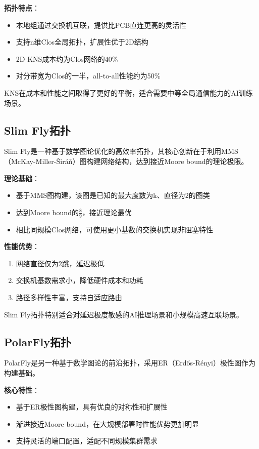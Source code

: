 \textbf{拓扑特点}：
\begin{itemize}
    \item 本地组通过交换机互联，提供比PCB直连更高的灵活性
    \item 支持n维Clos全局拓扑，扩展性优于2D结构
    \item 2D KNS成本约为Clos网络的40\%
    \item 对分带宽为Clos的一半，all-to-all性能约为50\%
\end{itemize}

KNS在成本和性能之间取得了更好的平衡，适合需要中等全局通信能力的AI训练场景。

\subsection{Slim Fly拓扑}

Slim Fly是一种基于数学图论优化的高效率拓扑，其核心创新在于利用MMS（McKay-Miller-\v{S}ir\'{a}\v{n}）图构建网络结构，达到接近Moore bound的理论极限。

\textbf{理论基础}：
\begin{itemize}
    \item 基于MMS图构建，该图是已知的最大度数为k、直径为2的图类
    \item 达到Moore bound的$\frac{8}{9}$，接近理论最优
    \item 相比同规模Clos网络，可使用更小基数的交换机实现非阻塞特性
\end{itemize}

\textbf{性能优势}：
\begin{enumerate}
    \item 网络直径仅为2跳，延迟极低
    \item 交换机基数需求小，降低硬件成本和功耗
    \item 路径多样性丰富，支持自适应路由
\end{enumerate}

Slim Fly拓扑特别适合对延迟极度敏感的AI推理场景和小规模高速互联场景。

\subsection{PolarFly拓扑}

PolarFly是另一种基于数学图论的前沿拓扑，采用ER（Erd\H{o}s-R\'{e}nyi）极性图作为构建基础。

\textbf{核心特性}：
\begin{itemize}
    \item 基于ER极性图构建，具有优良的对称性和扩展性
    \item 渐进接近Moore bound，在大规模部署时性能优势更加明显
    \item 支持灵活的端口配置，适配不同规模集群需求
\end{itemize}

